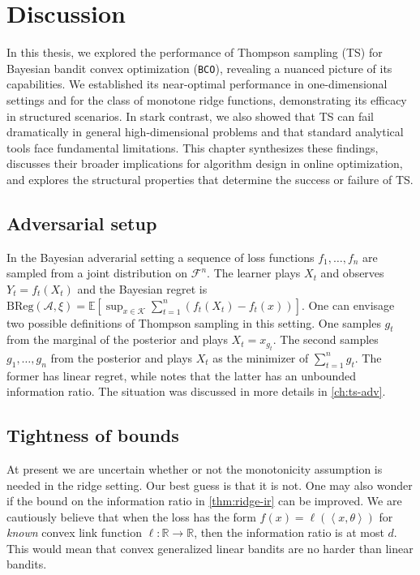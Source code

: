 \documentclass[letter, 12pt]{report}
\newcommand{\R}{\mathbb R}
\newcommand{\ip}[1]{\left \langle #1 \right \rangle}
\newcommand{\BReg}{\textrm{BReg}}
\newcommand{\E}{\mathbb E}
\newcommand{\cK}{\mathcal K}
\newcommand{\sF}{\mathscr F}
\newcommand{\sA}{\mathscr A}
\newcommand{\1}{\mathbf{1}}
\newcommand{\bco}{\texttt{BCO}\xspace}
\newcommand{\ts}{\textsc{TS}\xspace}
\theoremstyle{plain}
\theoremstyle{definition}
\theoremstyle{remark}
\begin{document}
\chapter{Discussion}
In this thesis, we explored the performance of Thompson sampling (\ts) for Bayesian bandit convex optimization (\bco), revealing a nuanced picture of its capabilities.
We established its near-optimal performance in one-dimensional
settings and for the class of monotone ridge functions,
demonstrating its efficacy in structured scenarios.
In stark contrast, we also showed that \ts can fail dramatically
in general high-dimensional problems and that standard analytical tools
face fundamental limitations.
This chapter synthesizes these findings, discusses their broader implications
for algorithm design in online optimization,
and explores the structural properties that determine the success or
failure of \ts.


\section{Adversarial setup} In the Bayesian adverarial setting a sequence of loss functions $f_1,\ldots,f_n$ are sampled from a joint distribution on $\sF^n$.
The learner plays $X_t$ and observes $Y_t = f_t(X_t)$ and the Bayesian regret is
$\BReg(\sA, \xi) = \E[\sup_{x \in \cK} \sum_{t=1}^n (f_t(X_t) - f_t(x))]$.
One can envisage two possible definitions of Thompson sampling in this setting. One samples $g_t$ from the marginal of the posterior and plays $X_t = x_{g_t}$.
The second samples $g_1,\ldots,g_n$ from the posterior and plays $X_t$ as the minimizer of $\sum_{t=1}^n g_t$.
The former has linear regret, while \cite{BDKP15} notes
that the latter has an unbounded information ratio. The situation was discussed in more details in \cref{ch:ts-adv}.
\section{Tightness of bounds} At present we are uncertain whether or not the monotonicity assumption is needed in the ridge setting. Our best guess is that it is not.
One may also wonder if the bound on the information ratio in \cref{thm:ridge-ir} can be improved. We are cautiously believe
that when the loss has the form $f(x) = \ell(\ip{x, \theta})$ for \textit{known} convex link function $\ell : \R \to \R$, then the information ratio is at most $d$.
This would mean that convex generalized linear bandits are no harder than linear bandits.
\end{document}
